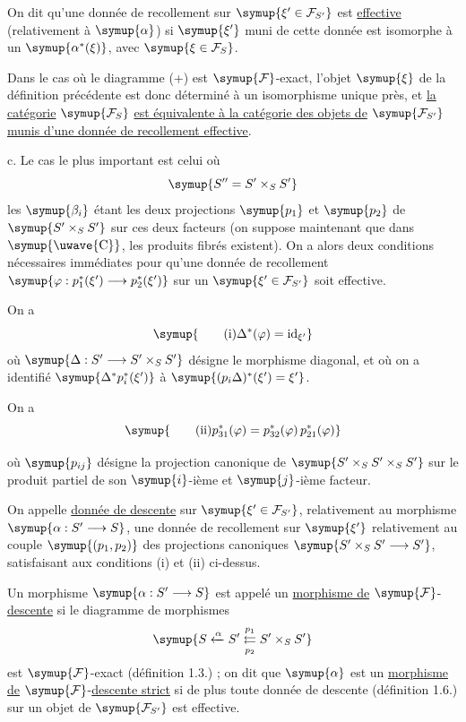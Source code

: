  On dit qu'une donnée de recollement sur
$\symup{\xi'\in\mathcal F_{S'}}$ est \uline{effective} (relativement à $\symup{\alpha}$) si
$\symup{\xi'}$ muni de cette donnée est isomorphe à un $\symup{\alpha^*(\xi)}$, avec
$\symup{\xi\in\mathcal F_S}$.

Dans le cas où le diagramme (+) est $\symup{\mathcal F}$-exact, l'objet $\symup{\xi}$ de la
définition précédente est donc déterminé à un isomorphisme unique près, et \uline{la catégorie} $\symup{\mathcal F_S}$ \uline{est équivalente à la catégorie des objets de}
$\symup{\mathcal F_{S'}}$ \uline{munis d'une donnée de recollement effective}.

\medskip\noindent
c. Le cas le plus important est celui où
\[
  \symup{S''=S'\times_S S'}
\]
les $\symup{\beta_i}$ étant les deux projections $\symup{p_1}$ et $\symup{p_2}$ de
$\symup{S'\times_S S'}$ sur ces deux facteurs (on suppose maintenant que dans
$\symup{\text{\uwave{C}}}$, les produits fibrés existent). On a alors deux conditions
nécessaires immédiates pour qu'une donnée de recollement
$\symup{\varphi:p_1^*(\xi')\longrightarrow p_2^*(\xi')}$ sur un
$\symup{\xi'\in\mathcal F_{S'}}$ soit effective.

On a
\[
  \symup{\tag{i}
  \Delta^*(\varphi)=\operatorname{id}_{\xi'}}
\]
où $\symup{\Delta:S'\longrightarrow S'\times_S S'}$ désigne le morphisme diagonal, et
où on a identifié $\symup{\Delta^*p_i^*(\xi')}$ à
$\symup{(p_i\Delta)^*(\xi')=\xi'}$.

On a
\[
  \symup{\tag{ii}
  p_{31}^*(\varphi)=p_{32}^*(\varphi)\,p_{21}^*(\varphi)}
\]

où $\symup{p_{ij}}$ désigne la projection canonique de
$\symup{S'\times_S S'\times_S S'}$ sur le produit partiel de son $\symup{i}$-ième et
$\symup{j}$-ième facteur.

 On appelle \uline{donnée de descente} sur
$\symup{\xi'\in\mathcal F_{S'}}$, relativement au morphisme
$\symup{\alpha:S'\longrightarrow S}$, une donnée de recollement sur $\symup{\xi'}$
relativement au couple $\symup{(p_1,p_2)}$ des projections canoniques
$\symup{S'\times_S S'\longrightarrow S'}$, satisfaisant aux conditions (i) et (ii)
ci-dessus.

 Un morphisme $\symup{\alpha:S'\longrightarrow S}$ est appelé
un \uline{morphisme de} $\symup{\mathcal F}$-\uline{descente} si le diagramme de morphismes
\[
  \symup{S\xleftarrow{\alpha}S'
  \overset{p_1}{\underset{p_2}{\leftleftarrows}}S'\times_S S'}
\]
est $\symup{\mathcal F}$-exact (définition 1.3.) ; on dit que $\symup{\alpha}$ est un
\uline{morphisme de} $\symup{\mathcal F}$-\uline{descente strict} si de plus toute donnée de
descente (définition 1.6.) sur un objet de $\symup{\mathcal F_{S'}}$ est effective.

